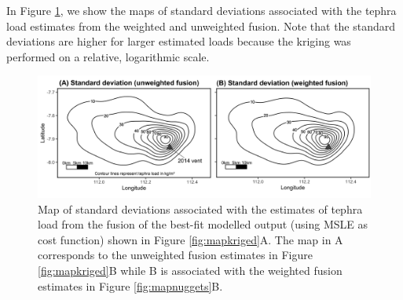 In Figure \ref{fig:mapkrig-sd}, we show the maps of standard deviations associated with the tephra load estimates from the weighted and unweighted fusion. Note that the standard deviations are higher for larger estimated loads because the kriging was performed on a relative, logarithmic scale.

    \begin{figure}[htbp!]
    \centering
    \includegraphics[width=\linewidth]{Figures/fig13_kriging-standarddev.png}
    \caption{Map of standard deviations associated with the estimates of tephra load from the fusion of the best-fit modelled output (using MSLE as cost function) shown in Figure \ref{fig:mapkriged}A. The map in A corresponds to the unweighted fusion estimates in Figure \ref{fig:mapkriged}B while B is associated with the weighted fusion estimates in Figure \ref{fig:mapnuggets}B. }
    \label{fig:mapkrig-sd}
    \end{figure}


